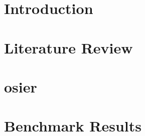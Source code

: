 \chapter{Introduction}
\chapter{Literature Review}
\label{chapter:lit-review}
% 

\chapter{\acf{osier}}
\label{chapter:osier}
% 


\chapter{Benchmark Results}
\label{chapter:benchmark-results}








